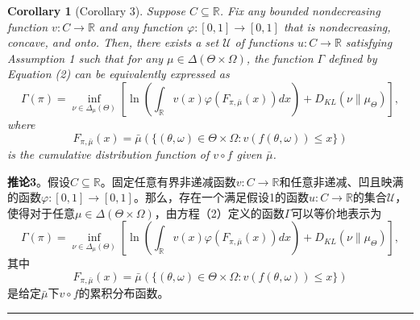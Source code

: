 \documentclass[12pt,a4paper]{article}
\newenvironment{translation}
  {\par\noindent\color{blue!70!black}\smallskip}
  {\par\medskip\hrule\medskip}
\newtheorem{corollary}[theorem]{Corollary}
\begin{document}
\begin{corollary}[Corollary 3]
Suppose $C \subseteq \mathbb{R}$. Fix any bounded nondecreasing function $v: C \to \mathbb{R}$ and any function $\varphi: [0, 1] \to [0, 1]$ that is nondecreasing, concave, and onto. Then, there exists a set $\mathcal{U}$ of functions $u: C \to \mathbb{R}$ satisfying Assumption 1 such that for any $\mu \in \Delta(\Theta \times \Omega)$, the function $\Gamma$ defined by Equation (2) can be equivalently expressed as
\[
\Gamma(\pi) = \inf_{\nu \in \Delta_\mu(\Theta)} \left[ \ln\left( \int_\mathbb{R} v(x) \varphi(F_{\pi,\bar{\mu}}(x)) dx \right) + D_{KL}(\nu\|\mu_\Theta) \right],
\]
where
\[
F_{\pi,\bar{\mu}}(x) = \bar{\mu}(\{(\theta, \omega) \in \Theta \times \Omega : v(f(\theta, \omega)) \leq x\})
\]
is the cumulative distribution function of $v \circ f$ given $\bar{\mu}$.
\end{corollary}
\begin{translation}
\textbf{推论3}。假设$C \subseteq \mathbb{R}$。固定任意有界非递减函数$v: C \to \mathbb{R}$和任意非递减、凹且映满的函数$\varphi: [0, 1] \to [0, 1]$。那么，存在一个满足假设1的函数$u: C \to \mathbb{R}$的集合$\mathcal{U}$，使得对于任意$\mu \in \Delta(\Theta \times \Omega)$，由方程（2）定义的函数$\Gamma$可以等价地表示为
\[
\Gamma(\pi) = \inf_{\nu \in \Delta_\mu(\Theta)} \left[ \ln\left( \int_\mathbb{R} v(x) \varphi(F_{\pi,\bar{\mu}}(x)) dx \right) + D_{KL}(\nu\|\mu_\Theta) \right],
\]
其中
\[
F_{\pi,\bar{\mu}}(x) = \bar{\mu}(\{(\theta, \omega) \in \Theta \times \Omega : v(f(\theta, \omega)) \leq x\})
\]
是给定$\bar{\mu}$下$v \circ f$的累积分布函数。
\end{translation}
\end{document}
